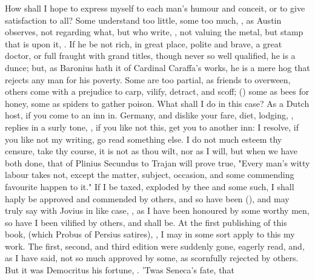How shall I hope to express myself to each man's humour and
conceit, or to give satisfaction to all? Some understand
too little, some too much, , as Austin observes, not regarding what, but who
write, , not valuing
the metal, but stamp that is upon it, .
If he be not rich, in great place, polite and brave, a great doctor, or full
fraught with grand titles, though never so well qualified, he is a dunce; but,
as Baronius hath it of Cardinal Caraffa's works, he is a
mere hog that rejects any man for his poverty. Some are too partial, as friends
to overween, others come with a prejudice to carp, vilify, detract, and scoff;
() some
as bees for honey, some as spiders to gather poison. What shall I do in this
case? As a Dutch host, if you come to an inn in. Germany, and dislike your
fare, diet, lodging, \etc{}, replies in a surly tone,
, if you like not this,
get you to another inn: I resolve, if you like not my writing, go read
something else. I do not much esteem thy censure, take thy course, it is not as
thou wilt, nor as I will, but when we have both done, that of
Plinius Secundus to Trajan will prove true, "Every man's
witty labour takes not, except the matter, subject, occasion, and some
commending favourite happen to it." If I be taxed, exploded by thee and some
such, I shall haply be approved and commended by others, and so have been
(), and may truly say with Jovius in
like case, , as I have been
honoured by some worthy men, so have I been vilified by others, and shall be.
At the first publishing of this book, (which Probus of
Persius satires), , I may in some sort apply to this my work. The first,
second, and third edition were suddenly gone, eagerly read, and, as I have
said, not so much approved by some, as scornfully rejected by others. But it
was Democritus his fortune, . 'Twas Seneca's fate, that
